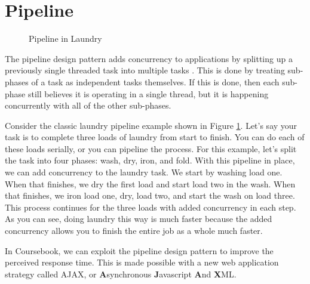 \section{Pipeline}

\begin{figure}[t]
  \begin{center}
  \caption{Pipeline in Laundry}
  \label{fig:laundry}
  \end{center}
\end{figure}

The pipeline design pattern adds concurrency to applications by splitting up a
previously single threaded task into multiple tasks \cite{Vermeulen95}. This is
done by treating sub-phases of a task as independent tasks themselves. If this
is done, then each sub-phase still believes it is operating in a single thread,
but it is happening concurrently with all of the other sub-phases.

Consider the classic laundry pipeline example shown in Figure \ref{fig:laundry}.
Let's say your task is to complete three loads of laundry from start to finish.
You can do each of these loads serially, or you can pipeline the process. For
this example, let's split the task into four phases: wash, dry, iron, and fold. 
With this pipeline in place, we can add concurrency to the laundry task. We
start by washing load one. When that finishes, we dry the first load and start 
load two in the wash. When that finishes, we iron load one, dry, load two, and
start the wash on load three. This process continues for the three loads with 
added concurrency in each step. As you can see, doing laundry this way is much
faster because the added concurrency allows you to finish the entire job as a
whole much faster.

In Coursebook, we can exploit the pipeline design pattern to improve the
perceived response time. This is made possible with a new web application
strategy called AJAX, or \textbf{A}synchronous \textbf{J}avascript \textbf{A}nd
\textbf{X}ML.

